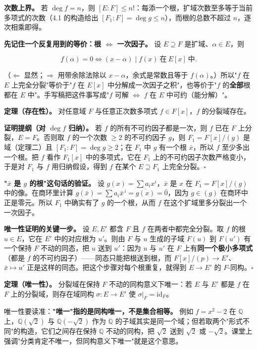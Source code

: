 \textbf{次数上界。} 若 $\deg f=n$，则 $[E:F]\le n!$：每添一个根，扩域次数至多等于当前多项式的次数（4.1 的构造给出 $[F_1:F]=\deg g\le n$），而根的总数不超过 $n$，逐次相乘即得。

\textbf{先记住一个反复用到的等价：根 $\iff$ 一次因子。} 设 $E\supseteq F$ 是扩域、$\alpha\in E$，则

\[
f(\alpha)=0\iff(x-\alpha)\mid f(x)\ \text{在}\ E[x]\ \text{中}.
\]

（$\Leftarrow$ 显然；$\Rightarrow$ 用带余除法除以 $x-\alpha$，余式是常数且等于 $f(\alpha)$。）所以"$f$ 在 $E$ 上完全分裂"等价于"$f$ 在 $E[x]$ 中分解成一次因子之积"，也等价于"$f$ 的\textbf{全部}根都在 $E$ 中"。手写稿把这件事写成"$f$ 可解 $\iff$ $f$ 在 $E$ 中可约（能分解）"。

\textbf{定理（存在性）。} 对任意域 $F$ 与任意正次数多项式 $f\in F[x]$，$f$ 的分裂域存在。

\textbf{证明提纲（对 $\deg f$ 归纳）。} 若 $f$ 的所有不可约因子都是一次，则 $f$ 已在 $F$ 上分裂，$E=F$。否则取 $f$ 的一个次数 $\ge2$ 的不可约因子 $g$，则 $F_1=F[x]/(g)$ 是域（定理二）且 $[F_1:F]=\deg g\ge2$；在 $F_1$ 中 $g$ 有一个根 $\bar x$，所以 $f$ 至少多出一个根。把 $f$ 看作 $F_1[x]$ 中的多项式，它在 $F_1$ 上的不可约因子次数严格变小，于是对 $F_1$ 与 $f$ 用归纳假设，得到 $f$ 在某个 $E\supseteq F_1$ 上完全分裂。$\square$

\textbf{"$\bar x$ 是 $g$ 的根"这句话的验证。} 设 $g(x)=\sum a_ix^i$，$\bar x$ 是 $x$ 在 $F_1=F[x]/(g)$ 中的像。在商环里计算 $g(\bar x)=\sum a_i\bar x^{\,i}=\overline{g(x)}=\bar 0$，因为 $g\in(g)$ 在商环中正是零元。所以 $F_1$ 中确实有了 $g$ 的一个根，从而 $f$ 在这个扩域里多分裂出一个一次因子。

\textbf{唯一性证明的关键一步。} 设 $E,E'$ 都含 $F$ 且 $f$ 在两者中都完全分裂。取 $f$ 的根 $u\in E$，它在 $E'$ 中的对应根为 $u'$。则由 $F$ 与 $u$ 生成的子域 $F(u)$ 到 $F(u')$ 有一个保持 $F$ 不动的同态，把 $u$ 送到 $u'$：因为 $u$ 与 $u'$ 在 $F$ 上有\textbf{同一个极小多项式}（都是 $f$ 的不可约因子）——同态只能把根送到根，而 $F[x]/(p)\to E'$、$\bar x\mapsto u'$ 正是这样的同态。把这个步骤对每个根重复，就得到 $E\to E'$ 的 $F$-同构。$\square$

\textbf{定理（唯一性）。} 分裂域在保持 $F$ 不动的同构意义下唯一：若 $E$ 与 $E'$ 都是 $f$ 在 $F$ 上的分裂域，则存在域同构 $\sigma:E\to E'$ 使 $\sigma|_F=\mathrm{id}_F$。

唯一性要读准：\textbf{"唯一"指的是同构唯一，不是集合相等。} 例如 $f=x^2-2$ 在 $\mathbb Q$ 上，$\mathbb Q(\sqrt2)$ 与 $\mathbb Q(-\sqrt2)$ 作为 $\mathbb Q$ 的子域其实是同一个域；但若取两个"形式不同"的构造，它们之间存在保持 $\mathbb Q$ 不动的同构，把 $\sqrt2$ 送到 $\sqrt2$ 或 $-\sqrt2$。课堂上强调"分类肯定不唯一，但同构意义下唯一"就是这个意思。

